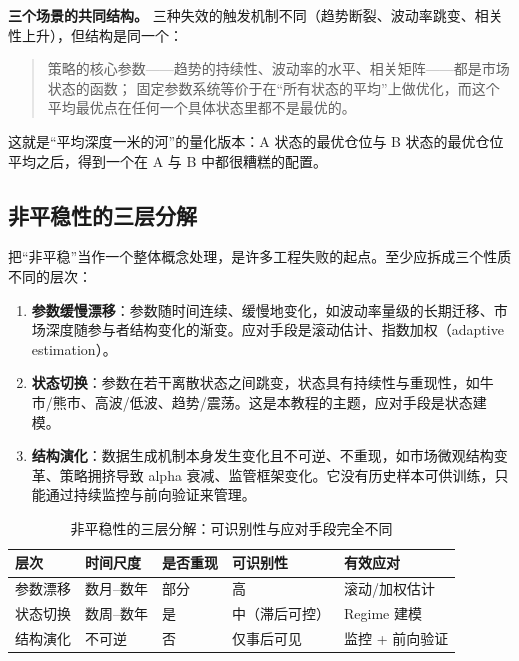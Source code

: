 \textbf{三个场景的共同结构。}
三种失效的触发机制不同（趋势断裂、波动率跳变、相关性上升），但结构是同一个：

\begin{quote}
策略的核心参数——趋势的持续性、波动率的水平、相关矩阵——都是市场状态的函数；
固定参数系统等价于在“所有状态的平均”上做优化，而这个平均最优点在任何一个具体状态里都不是最优的。
\end{quote}

这就是“平均深度一米的河”的量化版本：A 状态的最优仓位与 B 状态的最优仓位平均之后，得到一个在 A 与 B 中都很糟糕的配置。

\subsection{非平稳性的三层分解}

把“非平稳”当作一个整体概念处理，是许多工程失败的起点。至少应拆成三个性质不同的层次：

\begin{enumerate}[itemsep=3pt]
\item \textbf{参数缓慢漂移}：参数随时间连续、缓慢地变化，如波动率量级的长期迁移、市场深度随参与者结构变化的渐变。应对手段是滚动估计、指数加权（adaptive estimation）。
\item \textbf{状态切换}：参数在若干离散状态之间跳变，状态具有持续性与重现性，如牛市/熊市、高波/低波、趋势/震荡。这是本教程的主题，应对手段是状态建模。
\item \textbf{结构演化}：数据生成机制本身发生变化且不可逆、不重现，如市场微观结构变革、策略拥挤导致 alpha 衰减、监管框架变化。它没有历史样本可供训练，只能通过持续监控与前向验证来管理。
\end{enumerate}

\begin{table}[htbp]
\centering
\small
\begin{tabular}{p{2.1cm}p{2.4cm}p{2.0cm}p{2.3cm}p{2.6cm}}
\toprule
\textbf{层次} & \textbf{时间尺度} & \textbf{是否重现} & \textbf{可识别性} & \textbf{有效应对} \\
\midrule
参数漂移 & 数月--数年 & 部分 & 高 & 滚动/加权估计 \\
状态切换 & 数周--数年 & 是 & 中（滞后可控） & Regime 建模 \\
结构演化 & 不可逆 & 否 & 仅事后可见 & 监控 + 前向验证 \\
\bottomrule
\end{tabular}
\caption{非平稳性的三层分解：可识别性与应对手段完全不同}
\label{tab:nonstationarity}
\end{table}

